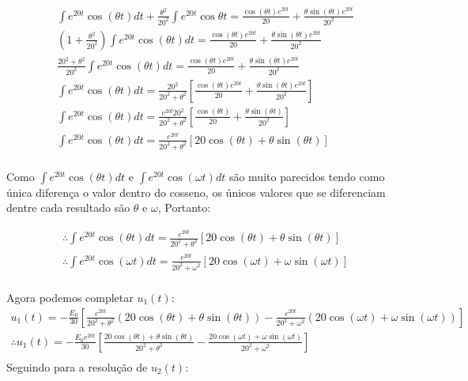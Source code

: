 \documentclass{abntex2}
\begin{document}
\begin{eqnarray*}
    {\int}e^{20t}\cos{(\theta t)}dt + \frac{\theta^2}{20^2}\int{e^{20t}}\cos{\theta t}=   \frac{\cos{(\theta t)}e^{20t}}{20} +\frac{\theta\sin{(\theta t)}{e^{20t}}}{20^2}\\
    \left(1 + \frac{\theta^2}{20^2}\right){\int}e^{20t}\cos{(\theta t)}dt=   \frac{\cos{(\theta t)}e^{20t}}{20} +\frac{\theta\sin{(\theta t)}{e^{20t}}}{20^2} \\
    \frac{20^2 +\theta^2}{20^2}{\int}e^{20t}\cos{(\theta t)}dt=   \frac{\cos{(\theta t)}e^{20t}}{20} +\frac{\theta\sin{(\theta t)}{e^{20t}}}{20^2} \\
    {\int}e^{20t}\cos{(\theta t)}dt=  \frac{20^2}{20^2 +\theta^2}\left[ \frac{\cos{(\theta t)}e^{20t}}{20} +\frac{\theta\sin{(\theta t)}{e^{20t}}}{20^2} \right] \\
    {\int}e^{20t}\cos{(\theta t)}dt=  \frac{e^{20t}20^2}{20^2 +\theta^2}\left[ \frac{\cos{(\theta t)}}{20} +\frac{\theta\sin{(\theta t)}}{20^2} \right] \\
    {\int}e^{20t}\cos{(\theta t)}dt=  \frac{e^{20t}}{20^2 +\theta^2}\left[ 20\cos{(\theta t)} +\theta\sin{(\theta t)} \right] \\
\end{eqnarray*}

\Large Como ${\int}e^{20t}\cos{(\theta t)}dt$ e $\int e^{20t}\cos{(\omega t)}dt$ são muito parecidos tendo como única diferença o valor dentro do cosseno, os únicos valores que se diferenciam dentre cada resultado são $\theta$ e $\omega$, Portanto:

\begin{eqnarray*}
    \therefore {\int}e^{20t}\cos{(\theta t)}dt=  \frac{e^{20t}}{20^2 +\theta^2}\left[ 20\cos{(\theta t)} +\theta\sin{(\theta t)} \right] \\
    \therefore {\int}e^{20t}\cos{(\omega t)}dt=  \frac{e^{20t}}{20^2 +\omega^2}\left[ 20\cos{(\omega t)} +\omega\sin{(\omega t)} \right] \\
\end{eqnarray*}

\Large Agora podemos completar $u_1(t)$:\\
\begin{eqnarray*}
    u_1(t) = -\frac{E_0}{30}\left[ \frac{e^{20t}}{20^2 +\theta^2}( 20\cos{(\theta t)} +\theta\sin{(\theta t)}) - \frac{e^{20t}}{20^2 +\omega^2} (20\cos{(\omega t)} +\omega\sin{(\omega t)})\right]\\
    \therefore u_1(t) = -\frac{E_0{e^{20t}}}{30}\left[ \frac{ 20\cos{(\theta t)} +\theta\sin{(\theta t)}}{20^2 +\theta^2} - \frac{20\cos{(\omega t)} +\omega\sin{(\omega t)}}{20^2 +\omega^2} \right]\\
\end{eqnarray*}
\Large Seguindo para a resolução de $u_2(t)$:
\end{document}
